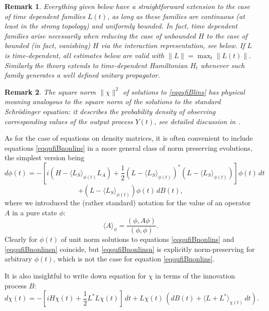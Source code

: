 \documentclass[10pt,a4paper]{amsart}
\newtheorem{remark}{Remark}
\begin{document}
\begin{remark}
\label{remtimedep}
Everything given below have a straightforward extension to the case of time dependent families $L(t)$, as
long as these families are continuous (at least in the strong topology)
 and uniformly bounded. In fact, time dependent families arise necessarily
when reducing the case of unbounded $H$ to the case of bounded (in fact, vanishing) $H$ via the interaction
 representation, see below. If $L$ is time-dependent, all estimates below are valid with $\|L\|=\max_t\|L(t)\|$.
Similarly the theory extends to time-dependent Hamiltonian $H_t$ whenever such family generates a well defined
unitary propagator.
\end{remark}


\begin{remark} The square norm $\|\chi\|^2$ of solutions to \eqref{eqqufiBlins} has physical meaning
analogous to the square norm of the solutions to the standard Schr\"odinger equation:
it describes the probability density of observing corresponding values of the output process $Y(t)$,
see detailed discussion in  \cite{BarchBook}.
\end{remark}


As for the case of equations on density matrices,
it is often convenient
to include equations \eqref{eqqufiBnonlins}
in a more general class of norm preserving evolutions, the simplest version being
\[
d\phi(t)=-[i(H-\langle L_S \rangle_{\phi(t)} L_A)
+\frac12 (L-\langle L_S \rangle_{\phi(t)})^*(L-\langle L_S \rangle_{\phi(t)})]\phi(t) \, dt
\]
\begin{equation}
\label{eqqufiBnonlinsn}
+ (L-\langle L_S \rangle_{\phi(t)})\phi(t) \, dB(t),
\end{equation}
where we introduced the (rather standard) notation for the value
of an operator $A$ in a pure state $\phi$:
\[
\langle A \rangle_{\phi}=\frac{(\phi, A \phi)}{(\phi, \phi)}.
\]
Clearly for $\phi(t)$ of unit norm solutions to equations \eqref{eqqufiBnonlins}
and \eqref{eqqufiBnonlinsn} coincide, but \eqref{eqqufiBnonlinsn} is explicitly norm-preserving
for arbitrary $\phi(t)$, which is not the case for equation \eqref{eqqufiBnonlins}.

It is also insightful to write down equation for $\chi$ in terms of the innovation process $B$:
\begin{equation}
\label{eqqufiBlinsB}
d\chi(t) =-[iH\chi(t) +\frac12 L^*L \chi(t) ]\,dt
+L \chi(t) \, (dB(t)+\langle L+L^*\rangle_{\chi(t)} \, dt).
\end{equation}
\end{document}
